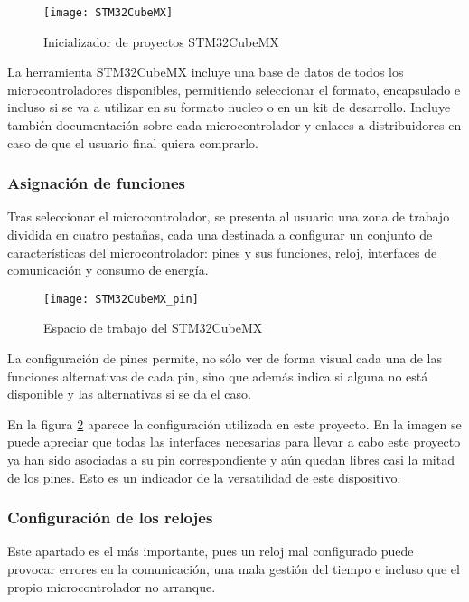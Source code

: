 \begin{figure} [h]
    \centering
    \texttt{[image: STM32CubeMX]}
    \caption{Inicializador de proyectos STM32CubeMX}
    \label{fig:STM32CubeMX}
\end{figure}

La herramienta STM32CubeMX incluye una base de datos de todos los microcontroladores disponibles, permitiendo seleccionar el formato, encapsulado e incluso si se va a utilizar en su formato nucleo o en un kit de desarrollo. Incluye también documentación sobre cada microcontrolador y enlaces a distribuidores en caso de que el usuario final quiera comprarlo. 

\subsubsection{Asignación de funciones\label{sec:Configuracion_micro_asignacion}}

Tras seleccionar el microcontrolador, se presenta al usuario una zona de trabajo dividida en cuatro pestañas, cada una destinada a configurar un conjunto de características del microcontrolador: pines y sus funciones, reloj, interfaces de comunicación y consumo de energía.

\begin{figure} [h]
    \centering
    \texttt{[image: STM32CubeMX\_pin]}
    \caption{Espacio de trabajo del STM32CubeMX}
    \label{fig:STM32CubeMX_pin}
\end{figure}

La configuración de pines permite, no sólo ver de forma visual cada una de las funciones alternativas de cada pin, sino que además indica si alguna no está disponible y las alternativas si se da el caso.

En la figura \ref{fig:STM32CubeMX_pin} aparece la configuración utilizada en este proyecto. En la imagen se puede apreciar que todas las interfaces necesarias para llevar a cabo este proyecto ya han sido asociadas a su pin correspondiente y aún quedan libres casi la mitad de los pines. Esto es un indicador de la versatilidad de este dispositivo.

\subsubsection{Configuración de los relojes\label{sec:Configuracion_micro_reloj}}

Este apartado es el más importante, pues un reloj mal configurado puede provocar errores en la comunicación, una mala gestión del tiempo e incluso que el propio microcontrolador no arranque.

